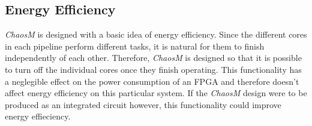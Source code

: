 
\subsection{Energy Efficiency}

\textit{ChaosM} is designed with a basic idea of energy efficiency. Since the
different cores in each pipeline perform different tasks, it is natural for them
to finish independently of each other. Therefore, \textit{ChaosM} is designed so
that it is possible to turn off the individual cores once they finish operating.
This functionality has a neglegible effect on the power consumption of an FPGA
and therefore doesn't affect energy efficiency on this particular system. If the
\textit{ChaosM} design were to be produced as an integrated circuit
however, this functionality could improve energy effieciency.

